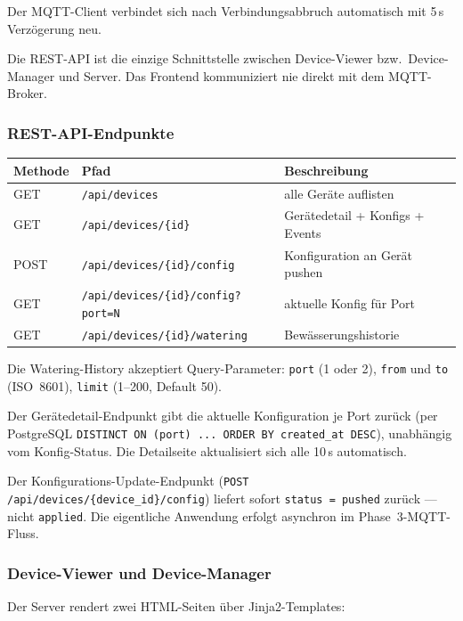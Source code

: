 \documentclass[a4paper,12pt]{article}
\begin{document}
\noindent Der MQTT-Client verbindet sich nach Verbindungsabbruch
automatisch mit 5\,s Verzögerung neu.

Die REST-API ist die einzige Schnittstelle zwischen Device-Viewer
bzw.\ Device-Manager und Server. Das Frontend kommuniziert nie direkt
mit dem MQTT-Broker.

\subsubsection{REST-API-Endpunkte}

\begin{center}
\begin{tabular}{lll}
\hline
\textbf{Methode} & \textbf{Pfad} & \textbf{Beschreibung} \\
\hline
GET  & \texttt{/api/devices}                       & alle Geräte auflisten \\
GET  & \texttt{/api/devices/\{id\}}                & Gerätedetail + Konfigs + Events \\
POST & \texttt{/api/devices/\{id\}/config}          & Konfiguration an Gerät pushen \\
GET  & \texttt{/api/devices/\{id\}/config?port=N}   & aktuelle Konfig für Port \\
GET  & \texttt{/api/devices/\{id\}/watering}         & Bewässerungshistorie \\
\hline
\end{tabular}
\end{center}

\noindent Die Watering-History akzeptiert Query-Parameter:
\texttt{port} (1 oder 2), \texttt{from} und \texttt{to} (ISO~8601),
\texttt{limit} (1--200, Default 50).

Der Gerätedetail-Endpunkt gibt die aktuelle Konfiguration je Port
zurück (per PostgreSQL
\texttt{DISTINCT ON (port) ... ORDER BY created\_at DESC}),
unabhängig vom Konfig-Status. Die Detailseite aktualisiert sich
alle 10\,s automatisch.

Der Konfigurations-Update-Endpunkt
(\texttt{POST /api/devices/\{device\_id\}/config}) liefert sofort
\texttt{status = pushed} zurück --- nicht \texttt{applied}. Die
eigentliche Anwendung erfolgt asynchron im Phase~3-MQTT-Fluss.

\subsubsection{Device-Viewer und Device-Manager}

Der Server rendert zwei HTML-Seiten über Jinja2-Templates:
\end{document}
